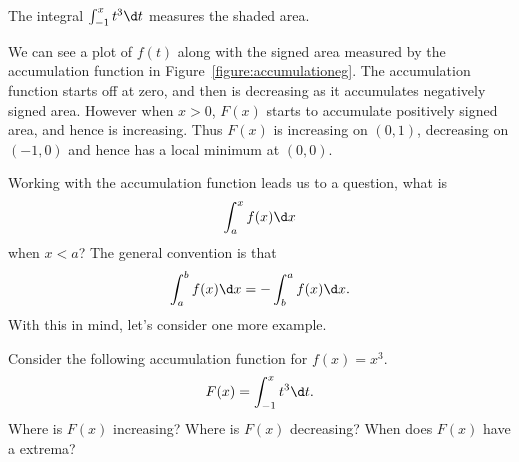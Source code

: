 \begin{marginfigure}[-3in]
\caption{The integral $\int_{-1}^x t^3 \d t$ measures the shaded area.}
\label{figure:accumulationeg}
\end{marginfigure}

\begin{solution}
We can see a plot of $f(t)$ along with the signed area measured by the
accumulation function in Figure~\ref{figure:accumulationeg}. The
accumulation function starts off at zero, and then is decreasing as it
accumulates negatively signed area. However when $x>0$, $F(x)$ starts
to accumulate positively signed area, and hence is increasing. Thus
$F(x)$ is increasing on $(0,1)$, decreasing on $(-1,0)$ and hence has
a local minimum at $(0,0)$.
\end{solution}

Working with the accumulation function leads us to a question, what is  
\[
\int_a^x f(x) \d x
\]
when $x< a$? The general convention is that 
\[
\int_a^b f(x) \d x = -\int_b^a f(x) \d x. 
\]
With this in mind, let's consider one more example.


\begin{example} 
Consider the following accumulation function for $f(x) = x^3$.
\[
F(x) = \int_{-1}^x t^3 \d t.
\]
Where is $F(x)$ increasing? Where is $F(x)$ decreasing? When does
$F(x)$ have a extrema?
\end{example}


